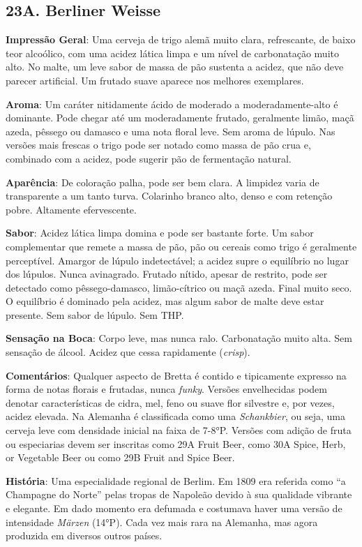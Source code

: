 \subsection*{23A. Berliner Weisse}
\textbf{Impressão Geral}: Uma cerveja de trigo alemã muito clara, refrescante, de baixo teor alcoólico, com uma acidez lática limpa e um nível de carbonatação muito alto. No malte, um leve sabor de massa de pão sustenta a acidez, que não deve parecer artificial. Um frutado suave aparece nos melhores exemplares.

\textbf{Aroma}: Um caráter nitidamente ácido de moderado a moderadamente-alto é dominante. Pode chegar até um moderadamente frutado, geralmente limão, maçã azeda, pêssego ou damasco e uma nota floral leve. Sem aroma de lúpulo. Nas versões mais frescas o trigo pode ser notado como massa de pão crua e, combinado com a acidez, pode sugerir pão de fermentação natural.

\textbf{Aparência}: De coloração palha, pode ser bem clara. A limpidez varia de transparente a um tanto turva. Colarinho branco alto, denso e com retenção pobre. Altamente efervescente.

\textbf{Sabor}: Acidez lática limpa domina e pode ser bastante forte. Um sabor complementar que remete a massa de pão, pão ou cereais como trigo é geralmente perceptível. Amargor de lúpulo indetectável; a acidez supre o equilíbrio no lugar dos lúpulos. Nunca avinagrado. Frutado nítido, apesar de restrito, pode ser detectado como pêssego-damasco, limão-cítrico ou maçã azeda. Final muito seco. O equilíbrio é dominado pela acidez, mas algum sabor de malte deve estar presente. Sem sabor de lúpulo. Sem THP.

\textbf{Sensação na Boca}: Corpo leve, mas nunca ralo. Carbonatação muito alta. Sem sensação de álcool. Acidez que cessa rapidamente (\textit{crisp}).

\textbf{Comentários}: Qualquer aspecto de Bretta é contido e tipicamente expresso na forma de notas florais e frutadas, nunca \textit{funky}. Versões envelhecidas podem denotar características de cidra, mel, feno ou suave flor silvestre e, por vezes, acidez elevada. Na Alemanha é classificada como uma \textit{Schankbier}, ou seja, uma cerveja leve com densidade inicial na faixa de 7-8°P. Versões com adição de fruta ou especiarias devem ser inscritas como 29A Fruit Beer, como 30A Spice, Herb, or Vegetable Beer ou como 29B Fruit and Spice Beer.

\textbf{História}: Uma especialidade regional de Berlim. Em 1809 era referida como “a Champagne do Norte” pelas tropas de Napoleão devido à sua qualidade vibrante e elegante. Em dado momento era defumada e costumava haver uma versão de intensidade \textit{Märzen} (14°P). Cada vez mais rara na Alemanha, mas agora produzida em diversos outros países.

